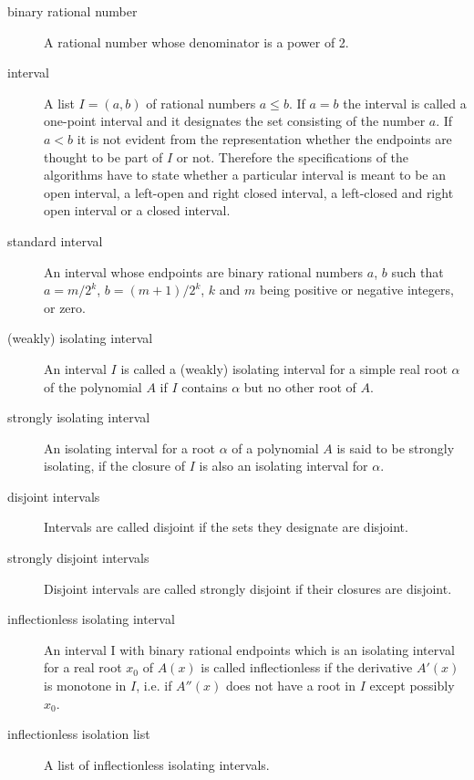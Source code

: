 \begin{description}
\item[binary rational number]
A rational number whose denominator is a power of 2.

\item[interval]
A list $I=(a,b)$ of rational numbers $a \leq b$.
If $a = b$ the interval is called a one-point interval and it
designates the set consisting of the number $a$.
If $a < b$ it is not evident from the representation whether
the endpoints are thought to be part of $I$ or not.
Therefore the specifications of the algorithms have to state
whether a particular interval is meant to be
an open interval,
a left-open and right closed interval,
a left-closed and right open interval or
a closed interval.

\item[standard interval]
An interval whose endpoints are binary rational numbers $a$, $b$ such that
$a = m / 2^k$, $b = (m+1) / 2^k$, $k$ and $m$ being positive or negative integers,
or zero.

\item[(weakly) isolating interval]
An interval $I$ is called a (weakly) isolating interval for a simple real
root $\alpha$ of the polynomial $A$ if $I$ contains $\alpha$ but no other
root of $A$.

\item[strongly isolating interval]
An isolating interval for a root $\alpha$ of a polynomial $A$ is said to be
strongly isolating, if the closure of $I$ is also an isolating interval
for $\alpha$.

\item[disjoint intervals]
Intervals are called disjoint if the sets they designate are disjoint.

\item[strongly disjoint intervals]
Disjoint intervals are called strongly disjoint if their closures are
disjoint.

\item[inflectionless isolating interval]
An interval I with binary rational endpoints which is an isolating interval
for a real root $x_0$ of $A(x)$
is called inflectionless if the derivative $A'(x)$ is monotone in $I$, i.e. if
$A''(x)$ does not have a root in $I$ except possibly $x_0$.

\item[inflectionless isolation list]
A list of inflectionless isolating intervals.

\end{description}


